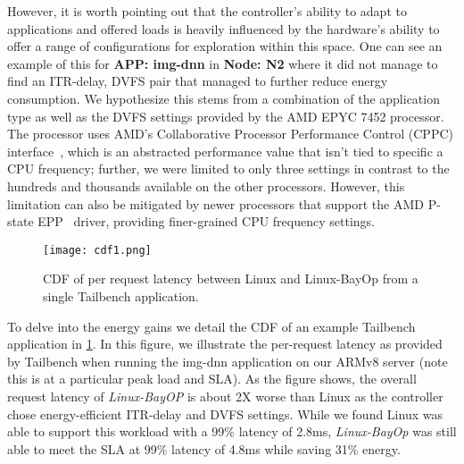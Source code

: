 However, it is worth pointing out that the controller's ability to adapt to applications and offered loads is heavily influenced by the hardware's ability to offer a range of configurations for exploration within this space. One can see an example of this for \textbf{APP: img-dnn} in \textbf{Node: N2} where it did not manage to find an ITR-delay, DVFS pair that managed to further reduce energy consumption. We hypothesize this stems from a combination of the application type as well as the DVFS settings provided by the AMD EPYC 7452 processor. The processor uses AMD's Collaborative Processor Performance Control (CPPC) interface~\cite{amdpstate}, which is an abstracted performance value that isn't tied to specific a CPU frequency; further, we were limited to only three settings in contrast to the hundreds and thousands available on the other processors. However, this limitation can also be mitigated by newer processors that support the AMD P-state EPP~\cite{amdepp} driver, providing finer-grained CPU frequency settings.

\begin{figure}[!htb]
\centering
    \texttt{[image: cdf1.png]}
    \caption{\small CDF of per request latency between Linux and Linux-BayOp from a single Tailbench application.}
    \label{fig:cdf1}
    \vspace{-0.2in}
\end{figure}

To delve into the energy gains 
we detail the CDF of an example Tailbench application in \cref{fig:cdf1}. In this figure, we illustrate the per-request latency as provided by Tailbench when running the img-dnn application on our ARMv8 server (note this is at a particular peak load and SLA). As the figure shows, the overall request latency of \textit{Linux-BayOP} is about 2X worse than Linux as the controller chose energy-efficient ITR-delay and DVFS settings. While we found Linux was able to support this workload with a 99\% latency of 2.8ms, \textit{Linux-BayOp} was still able to meet the SLA at 99\% latency of 4.8ms while saving 31\% energy.
